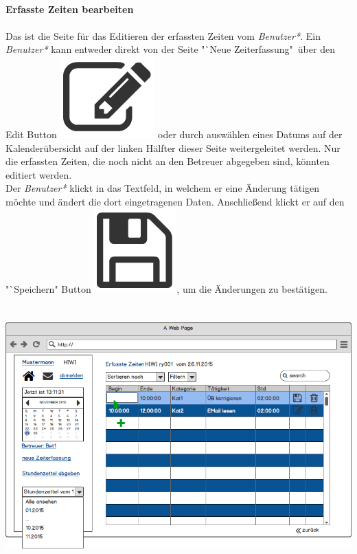 \newpage
\textbf{\\Erfasste Zeiten bearbeiten}\\
\\
Das ist die Seite für das Editieren der erfassten Zeiten vom \emph{Benutzer*}.
Ein \emph{Benutzer*} kann entweder direkt von der Seite "`Neue Zeiterfassung"\  über den Edit Button \includegraphics[scale=.1]{UI/Button/Edit.png} oder durch auswählen eines Datums auf der Kalenderübersicht auf der linken Hälfter dieser Seite weitergeleitet werden. Nur die erfassten Zeiten, die noch nicht an den Betreuer abgegeben sind, könnten editiert werden.\\
Der \emph{Benutzer*} klickt in das Textfeld, in welchem er eine Änderung tätigen möchte und ändert die dort eingetragenen Daten. Anschließend klickt er auf den "`Speichern" Button \includegraphics[scale=.1]{UI/Button/Save.png}, um die Änderungen zu bestätigen.\\
\\
\\
\includegraphics[width=\linewidth]{UI/Benutzer/Editieren.png}





